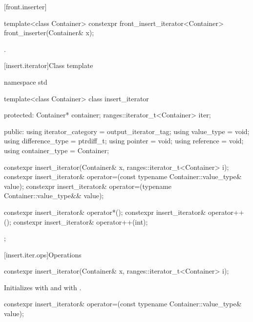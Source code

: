 [front.inserter]{}

%
\begin{itemdecl}
template<class Container>
  constexpr front_insert_iterator<Container> front_inserter(Container& x);
\end{itemdecl}

\begin{itemdescr}
\pnum
\returns
{}.
\end{itemdescr}

[insert.iterator]{Class template }

%
\begin{codeblock}
namespace std {
  template<class Container>
  class insert_iterator {
  protected:
    Container* container;
    ranges::iterator_t<Container> iter;

  public:
    using iterator_category = output_iterator_tag;
    using value_type        = void;
    using difference_type   = ptrdiff_t;
    using pointer           = void;
    using reference         = void;
    using container_type    = Container;

    constexpr insert_iterator(Container& x, ranges::iterator_t<Container> i);
    constexpr insert_iterator& operator=(const typename Container::value_type& value);
    constexpr insert_iterator& operator=(typename Container::value_type&& value);

    constexpr insert_iterator& operator*();
    constexpr insert_iterator& operator++();
    constexpr insert_iterator& operator++(int);
  };
}
\end{codeblock}

[insert.iter.ops]{Operations}

%
\begin{itemdecl}
constexpr insert_iterator(Container& x, ranges::iterator_t<Container> i);
\end{itemdecl}

\begin{itemdescr}
\pnum
\effects
Initializes
with  and
with .
\end{itemdescr}

%
\begin{itemdecl}
constexpr insert_iterator& operator=(const typename Container::value_type& value);
\end{itemdecl}


